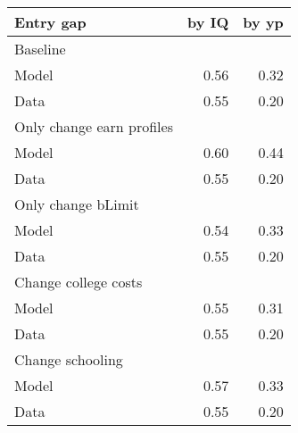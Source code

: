 \begin{tabular}{lrr}
\hline
Entry gap & by IQ  & by yp  \\
\hline
Baseline &   &   \\
Model & 0.56  & 0.32  \\
Data & 0.55  & 0.20  \\
Only change earn profiles &   &   \\
Model & 0.60  & 0.44  \\
Data & 0.55  & 0.20  \\
Only change bLimit &   &   \\
Model & 0.54  & 0.33  \\
Data & 0.55  & 0.20  \\
Change college costs &   &   \\
Model & 0.55  & 0.31  \\
Data & 0.55  & 0.20  \\
Change schooling &   &   \\
Model & 0.57  & 0.33  \\
Data & 0.55  & 0.20  \\
\hline
\end{tabular}%
